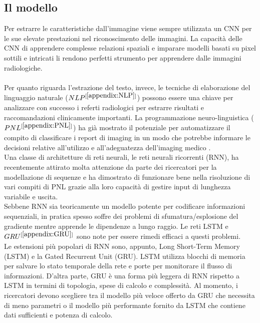 \documentclass[12pt,a4paper]{report}
\begin{document}
\subsection{Il modello}
Per estrarre le caratteristiche dall’immagine viene sempre utilizzata un CNN per le sue elevate prestazioni nel riconoscimento delle immagini. La capacità delle CNN di apprendere complesse relazioni spaziali e
imparare modelli basati su pixel sottili e intricati li rendono perfetti strumento per apprendere dalle immagini radiologiche. \\
\\
Per quanto riguarda l'estrazione del testo, invece, le tecniche di elaborazione del linguaggio naturale ($NLP^{[\ref{appendix:NLP}]}$) possono essere una chiave per analizzare con successo i referti radiologici per estrarre risultati e raccomandazioni clinicamente importanti. La programmazione neuro-linguistica ($PNL^{[\ref{appendix:PNL}]}$) ha già mostrato il potenziale per automatizzare il compito di classificare i report di imaging in un modo che potrebbe informare le decisioni relative all'utilizzo e all'adeguatezza dell'imaging medico \cite{banerjee2019comparative}.\\
Una classe di architetture di reti neurali, le reti neurali ricorrenti (RNN), ha recentemente attirato molta attenzione da parte dei ricercatori per la modellazione di sequenze e ha dimostrato di funzionare bene nella risoluzione di vari compiti di PNL grazie alla loro capacità di gestire input di lunghezza variabile e uscita.\\
Sebbene RNN sia teoricamente un modello potente per codificare informazioni sequenziali, in pratica spesso soffre dei problemi di sfumatura/esplosione del gradiente mentre apprende le dipendenze a lungo raggio. Le reti LSTM e $GRU^{[\ref{appendix:GRU}]}$ sono note per essere rimedi efficaci a questi problemi.\\
Le estensioni più popolari di RNN sono, appunto, Long Short-Term Memory (LSTM) e la Gated Recurrent Unit (GRU).
LSTM utilizza blocchi di memoria per salvare lo stato temporale della rete e porte per monitorare il flusso di informazioni. D'altra parte, GRU è una forma più leggera di RNN rispetto a LSTM in termini di topologia, spese di calcolo e complessità. Al momento, i ricercatori devono scegliere tra il modello più veloce offerto da GRU che necessita di meno parametri o il modello più performante fornito da LSTM che contiene dati sufficienti e potenza di calcolo.\\
\end{document}
